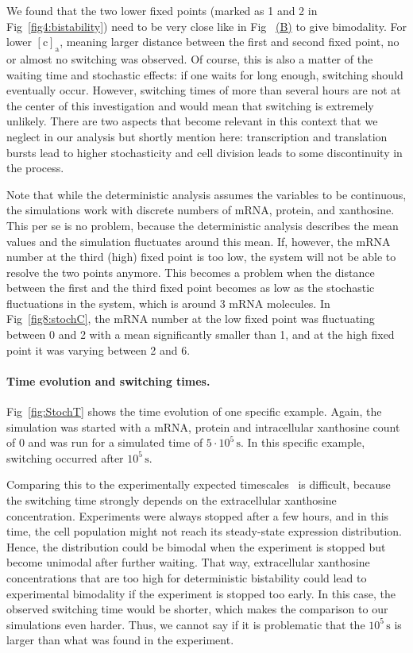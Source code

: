\documentclass[10pt,letterpaper]{article}
\newcommand{\unit}[1]{\,\mathrm{#1}}
\newcommand{\n}[1]{\mathrm{#1}}
\newcommand\subref[2]{%
	\def\myref{\getrefnumber{#1}}%
	\hyperref[#1]{\myref\mbox{#2}}%
}
\begin{document}
We found that the two lower fixed points (marked as 1 and 2 in
Fig~\ref{fig4:bistability}) need to be very close like in
Fig~\subref{fig8:stochC}{(B)} to give bimodality. For lower $\n{[c]_a}$,
meaning larger distance between the first and second fixed point, no or
almost no switching was observed. Of course, this is also a matter of the
waiting time and stochastic effects: if one waits for long enough, switching
should eventually occur. However, switching times of more than several hours
are not at the center of this investigation and would mean that switching is
extremely unlikely. There are two aspects that become relevant in this
context that we neglect in our analysis but shortly mention here:
transcription and translation bursts lead to higher stochasticity and cell
division leads to some discontinuity in the process.

Note that while the deterministic analysis assumes the variables to be
continuous, the simulations work with discrete numbers of mRNA, protein, and
xanthosine. This per se is no problem, because the deterministic analysis
describes the mean values and the simulation fluctuates around this mean.
If, however, the mRNA number at the third (high) fixed point is too low, the
system will not be able to resolve the two points anymore. This becomes a
problem when the distance between the first and the third fixed point
becomes as low as the stochastic fluctuations in the system, which is around
3 mRNA molecules. In Fig~\ref{fig8:stochC}, the mRNA number at the low fixed
point was fluctuating between 0 and 2 with a mean significantly smaller than
1, and at the high fixed point it was varying between 2 and 6.

\paragraph*{Time evolution and switching times.}
Fig~\ref{fig:StochT} shows the time evolution of one specific example.
Again, the simulation was started with a mRNA, protein and intracellular
xanthosine count of 0 and was run for a simulated time of $5 \cdot 10^5
\unit{s}$. In this specific example, switching occurred after $10^5
\unit{s}$. 

Comparing this to the experimentally expected timescales~\cite{Chure2019} is difficult,
because the switching time strongly depends on the extracellular xanthosine
concentration. Experiments were always stopped after a few hours, and in
this time, the cell population might not reach its steady-state expression
distribution. Hence, the distribution could be bimodal when the experiment
is stopped but become unimodal after further waiting. That way,
extracellular xanthosine concentrations that are too high for deterministic
bistability could lead to experimental bimodality if the experiment is
stopped too early. In this case, the observed switching time would be
shorter, which makes the comparison to our simulations even harder. Thus, we
cannot say if it is problematic that the $10^5 \unit{s}$ is larger than what
was found in the experiment.
\end{document}
